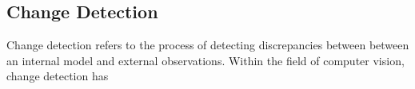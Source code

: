 \subsection{Change Detection}

Change detection refers to the process of detecting discrepancies between between an internal model and external observations. Within the field of computer vision, change detection has 